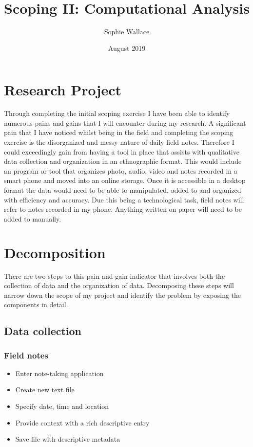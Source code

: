 \documentclass{article}
\title{Scoping II: Computational Analysis}
\author{Sophie Wallace }
\date{August 2019}
\begin{document}
\maketitle

\section{Research Project}
Through completing the initial scoping exercise I have been able to identify numerous pains and gains that I will encounter during my research. A significant pain that I have noticed whilst being in the field and completing the scoping exercise is the disorganized and messy nature of daily field notes. Therefore I could exceedingly gain from having a tool in place that assists with qualitative data collection and organization in an ethnographic format. This would include an program or tool that organizes photo, audio, video and notes recorded in a smart phone and moved into an online storage. Once it is accessible in a desktop format the data would need to be able to manipulated, added to and organized with efficiency and accuracy. Due this being a technological task, field notes will refer to notes recorded in my phone. Anything written on paper will need to be added to manually. 

\section{Decomposition}
There are two steps to this pain and gain indicator that involves both the collection of data and the organization of data. Decomposing these steps will narrow down the scope of my project and identify the problem by exposing the components in detail. 

\subsection{Data collection}
\subsubsection{Field notes}
\begin{itemize}
\item Enter note-taking application
\item Create new text file 
\item Specify date, time and location
\item Provide context with a rich descriptive entry
\item Save file with descriptive metadata
\end{itemize}
\end{document}
